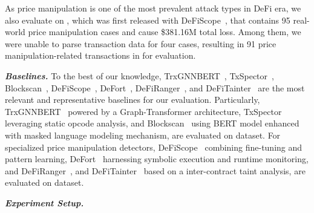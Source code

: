 As price manipulation is one of the most prevalent attack types in DeFi era, we also evaluate \approach{} on \done{}, which was first released with DeFiScope~\cite{zhong2025detectingvariousdefiprice}, that contains 95 real-world price manipulation cases and cause \$381.16M total loss.
Among them, we were unable to parse transaction data for four cases, resulting in 91 price manipulation-related transactions in \done{} for evaluation.






\textit{\textbf{Baselines.}}
To the best of our knowledge, TrxGNNBERT~\cite{TrxGNNBERT}, TxSpector~\cite{TXSPECTOR}, Blockscan~\cite{wu2025blockscan}, DeFiScope~\cite{zhong2025detectingvariousdefiprice}, DeFort~\cite{defort2024}, DeFiRanger~\cite{defiranger2021}, and DeFiTainter~\cite{defitainter2023} are the most relevant and representative baselines for our evaluation.
Particularly,  TrxGNNBERT~\cite{TrxGNNBERT} powered by a Graph-Transformer architecture, TxSpector~\cite{TXSPECTOR} leveraging static opcode analysis, and Blockscan~\cite{wu2025blockscan} using BERT model enhanced with masked language modeling mechanism, are evaluated on \dsystem{} dataset.
For specialized price manipulation detectors, DeFiScope~\cite{zhong2025detectingvariousdefiprice} combining fine-tuning and pattern learning, DeFort~\cite{defort2024} harnessing symbolic execution and runtime monitoring, and DeFiRanger~\cite{defiranger2021}, and DeFiTainter~\cite{defitainter2023} based on a inter-contract taint analysis, are evaluated on \done{} dataset.


\textit{\textbf{Experiment Setup.}}







